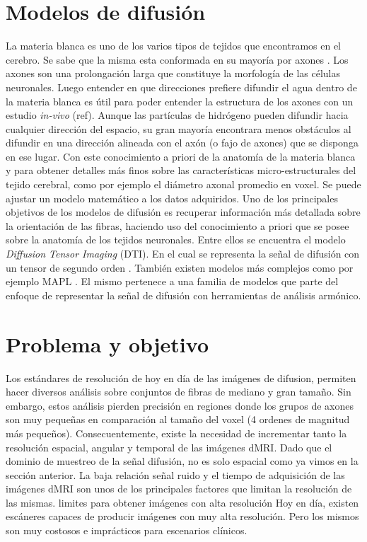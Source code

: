 \section{Modelos de difusi\'on}
La materia blanca es uno de los varios tipos de tejidos que encontramos en el cerebro. Se sabe que 
la misma esta conformada en su mayor\'ia por axones \citep{Purves2004}. Los axones son una 
prolongaci\'on larga que constituye la morfolog\'ia de las c\'elulas neuronales. 
Luego entender en que direcciones prefiere difundir el agua dentro de la materia 
blanca es \'util para poder entender la estructura de los axones con un estudio \textit{in-vivo} 
(ref). Aunque las part\'iculas de hidr\'ogeno pueden difundir hacia cualquier 
direcci\'on del espacio, su gran mayor\'ia encontrara menos obst\'aculos al difundir en una 
direcci\'on alineada con el ax\'on (o fajo de axones) que se disponga en ese lugar. Con este 
conocimiento a priori de la anatomía de la materia blanca y para obtener detalles más finos sobre 
las características micro-estructurales del tejido cerebral, como por ejemplo el diámetro axonal 
promedio en voxel. Se puede ajustar un modelo matemático a los datos adquiridos. Uno de los 
principales objetivos de los modelos de difusión es recuperar información más detallada sobre la 
orientación de las fibras, haciendo uso del conocimiento a priori que se posee sobre la anatomía de 
los tejidos neuronales. Entre ellos se encuentra el modelo \textit{Diffusion Tensor Imaging} (DTI). 
En el cual se representa la se\~nal de difusión con un tensor de segundo orden \citep{Basser1994}. 
También existen modelos más complejos como por ejemplo MAPL \citep{Fick2016365}. El mismo pertenece 
a una familia de modelos que parte del enfoque de representar la señal de difusión con 
herramientas de análisis armónico.

\section{Problema y objetivo}
Los estándares de resolución de hoy en día de las imágenes de difusion, permiten hacer diversos 
análisis sobre conjuntos de fibras de mediano y gran tamaño. Sin embargo, estos análisis pierden 
precisión en regiones donde los grupos de axones 
son muy pequeñas en comparación al tamaño del voxel (4 ordenes de magnitud más pequeños). 
Consecuentemente, existe la 
necesidad de incrementar tanto la resolución espacial, angular y temporal de las imágenes dMRI. 
Dado 
que el dominio de 
muestreo de la señal difusión, no es solo espacial como ya vimos en la sección anterior. La baja 
relación señal ruido y el tiempo de adquisición de las 
imágenes dMRI son unos de los principales factores que limitan la resolución de las mismas. %
limites para obtener imágenes con alta resolución 
Hoy en día, existen escáneres capaces de producir imágenes con muy alta resolución. Pero los mismos 
son muy costosos e 
imprácticos para escenarios clínicos. 

